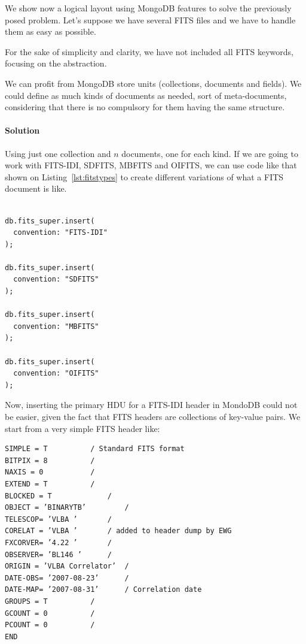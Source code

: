 We show now a logical layout using MongoDB features to solve the previously posed problem. Let's suppose we have several FITS files and we have to handle them as easy as possible.

For the sake of simplicity and clarity, we have not included all FITS keywords, focusing on the abstraction.

We can profit from MongoDB store units (collections, documents and fields). We could define as much kinds of documents as needed, sort of meta-documents, considering that there is no compulsory for them having the same structure. 

\paragraph{Solution}

Using just one collection and $n$ documents, one for each kind. If we are going to work with FITS-IDI, SDFITS, MBFITS and OIFITS, we can use code like that shown on Listing~\ref{lst:fitstypes} to create different variations of what a FITS document is like.

\begin{lstlisting}[float,label=lst:fitstypes,caption=MongoDB BSON code for creating the different FITS document types.]

db.fits_super.insert(
  convention: "FITS-IDI"
);

db.fits_super.insert(
  convention: "SDFITS"
);

db.fits_super.insert(
  convention: "MBFITS"
);

db.fits_super.insert(
  convention: "OIFITS"
);

\end{lstlisting}



Now, inserting the primary HDU for a  FITS-IDI header in MondoDB could not be
easier, given the fact that FITS headers are collections of key-value pairs. %
We start from a very simple FITS header like: 
\begin{verbatim}
SIMPLE = T 			/ Standard FITS format
BITPIX = 8 			/
NAXIS = 0 			/
EXTEND = T 			/
BLOCKED = T 			/
OBJECT = ’BINARYTB’ 		/
TELESCOP= ’VLBA ’ 		/
CORELAT = ’VLBA ’ 		/ added to header dump by EWG
FXCORVER= ’4.22 ’ 		/
OBSERVER= ’BL146 ’ 		/
ORIGIN = ’VLBA Correlator’ 	/
DATE-OBS= ’2007-08-23’ 		/
DATE-MAP= ’2007-08-31’ 		/ Correlation date
GROUPS = T 			/
GCOUNT = 0 			/
PCOUNT = 0 			/
END
\end{verbatim}


